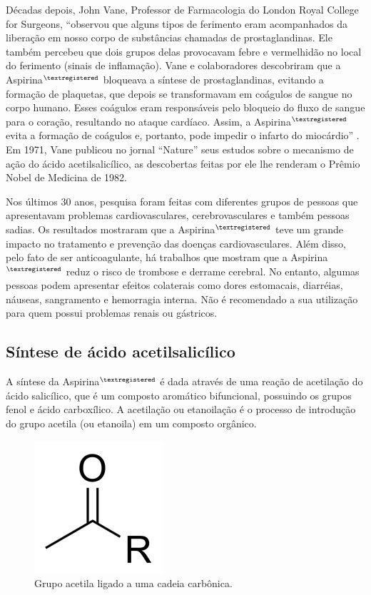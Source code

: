Décadas depois, John Vane, Professor de Farmacologia do London Royal College for Surgeons, “observou que
alguns tipos de ferimento eram acompanhados da liberação em nosso corpo de substâncias chamadas de
prostaglandinas. Ele também percebeu que dois grupos delas provocavam febre e vermelhidão no local do
ferimento (sinais de inflamação). Vane e colaboradores descobriram que a
Aspirina$^{\tiny{\textregistered}}$ bloqueava a síntese de prostaglandinas, evitando a formação de
plaquetas, que depois se transformavam em coágulos de sangue no corpo humano. Esses coágulos eram
responsáveis pelo bloqueio do fluxo de sangue para o coração, resultando no ataque cardíaco. Assim, a
Aspirina$^{\tiny{\textregistered}}$ evita a formação de coágulos e, portanto, pode impedir o infarto do
miocárdio” \cite{massabni2006}. Em 1971, Vane publicou no jornal “Nature” seus estudos sobre o mecanismo de
ação do ácido acetilsalicílico, as descobertas feitas por ele lhe renderam o Prêmio Nobel de Medicina de
1982. 

Nos últimos 30 anos, pesquisa foram feitas com diferentes grupos de pessoas que apresentavam problemas
cardiovasculares, cerebrovasculares e também pessoas sadias. Os resultados mostraram que a
Aspirina$^{\tiny{\textregistered}}$ teve um grande impacto no tratamento e prevenção das doenças
cardiovasculares.  Além disso, pelo fato de ser anticoagulante, há trabalhos que mostram que a
Aspirina$^{\tiny{\textregistered}}$ reduz o risco de trombose e derrame cerebral. No entanto, algumas
pessoas podem apresentar efeitos colaterais como dores estomacais, diarréias, náuseas, sangramento e
hemorragia interna. Não é recomendado a sua utilização para quem possui problemas renais ou gástricos.

\subsection{Síntese de ácido acetilsalicílico}

A síntese da Aspirina$^{\tiny{\textregistered}}$ é dada através de uma reação de acetilação do ácido
salicílico, que é um composto aromático bifuncional, possuindo os grupos fenol e ácido carboxílico. A
acetilação ou etanoilação é o processo de introdução do grupo acetila (ou etanoila) em um composto
orgânico.

\begin{figure}[H]
\begin{center}
    \includegraphics[width=.4\textwidth]{figuras/im1.png}
\end{center}
\caption{Grupo acetila ligado a uma cadeia carbônica.}\label{fig:im1}
\end{figure}

